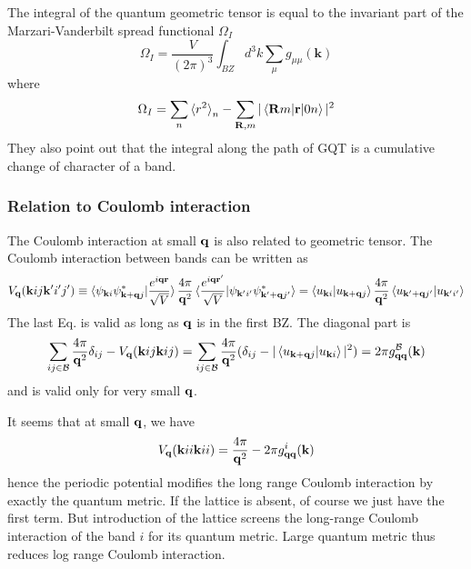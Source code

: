 \documentclass[onecolumn, prb,preprintnumbers,amsmath,amssymb,floatfix]{revtex4}
\renewcommand{\vr}{{\mathbf{r}}}
\newcommand{\vk}{{\mathbf{k}}}
\newcommand{\cb}{{\cal B}}
\begin{document}
The integral of the quantum geometric tensor is equal to the
invariant part of the Marzari-Vanderbilt spread functional $\Omega_{I}$
\begin{equation}
\Omega_I = \frac{V}{(2\pi)^3}\int_{BZ}d^3k\sum_\mu g_{\mu\mu}(\vk)
\end{equation}
where
\begin{equation}
\Omega_I = \sum_n \braket{r^2}_n - \sum_{\vR,m}|\braket{\vR m|\vr|0 n}|^2
\end{equation}  
They also point out that the integral along the path of GQT is a cumulative change of character of a band.


\subsubsection{Relation to Coulomb interaction}
The Coulomb interaction at small ${\mathbf{q}}$ is also related to geometric tensor. The Coulomb interaction between bands can be written as
\begin{eqnarray}
V_\vq(\vk i j \vk' i'j') \equiv \braket{\psi_{\vk i}\psi^*_{\vk+\vq j} |\frac{e^{i\vq \vr}}{\sqrt{V}}}  \frac{4\pi}{\vq^2}
\braket{\frac{e^{i\vq \vr'}}{\sqrt{V}}|\psi_{\vk' i'}\psi^*_{\vk'+\vq j'} } =\braket{u_{\vk i}|u_{\vk+\vq j}}  \frac{4\pi}{\vq^2}
\braket{u_{\vk'+\vq j'} |u_{\vk' i'}} 
\end{eqnarray}
The last Eq. is valid as long as ${\mathbf{q}}$ is in the first BZ.
The diagonal part is
\begin{eqnarray}
 \sum_{ij\in \cb} \frac{4\pi}{\vq^2}\delta_{ij}-V_\vq(\vk i j \vk i j) = \sum_{ij\in \cb} \frac{4\pi}{\vq^2}(\delta_{ij}-
|\braket{u_{\vk+\vq j} |u_{\vk i}}|^2)=2\pi g^\cb_{\vq\vq}(\vk)
\end{eqnarray}  
and is valid only for very small ${\mathbf{q}}$.

It seems that at small ${\mathbf{q}}$, we have
\begin{eqnarray}
V_\vq(\vk i i \vk i i)   = \frac{4\pi}{\vq^2}-2\pi g^i_{\vq\vq}(\vk)
\end{eqnarray}
hence the periodic potential modifies the long range Coulomb
interaction by exactly the quantum metric. If the lattice is absent,
of course we just have the first term. But introduction of the lattice
screens the long-range Coulomb interaction of the band $i$ for its
quantum metric. Large quantum metric thus reduces log range Coulomb interaction.
\end{document}

